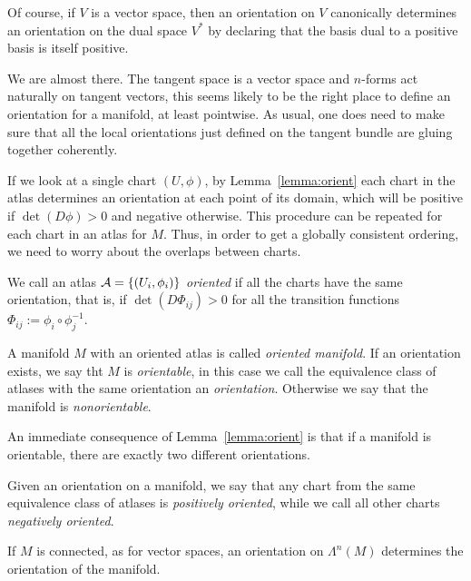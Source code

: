 \begin{remark}
  Of course, if $V$ is a vector space, then an orientation on $V$ canonically determines an orientation on the dual space $V^*$ by declaring that the basis dual to a positive basis is itself positive.
\end{remark}

We are almost there.
The tangent space is a vector space and $n$-forms act naturally on tangent vectors, this seems likely to be the right place to define an orientation for a manifold, at least pointwise.
As usual, one does need to make sure that all the local orientations just defined on the tangent bundle are gluing together coherently.

\begin{remark}
  If we look at a single chart $(U,\phi)$, by Lemma~\ref{lemma:orient} each chart in the atlas determines an orientation at each point of its domain, which will be positive if $\det(D\phi)>0$ and negative otherwise.
  This procedure can be repeated for each chart in an atlas for $M$.
  Thus, in order to get a globally consistent ordering, we need to worry about the overlaps between charts.
\end{remark}

\begin{definition}
  We call an atlas $\mathcal{A} = \{(U_i,\phi_i)\}$ \emph{oriented} if all the charts have the same orientation, that is, if $\det(D\Phi_{ij}) > 0$ for all the transition functions $\Phi_{ij} := \phi_i\circ\phi_j^{-1}$.

  A manifold $M$ with an oriented atlas is called \emph{oriented manifold}.
  If an orientation exists, we say tht $M$ is \emph{orientable}, in this case we call the equivalence class of atlases with the same orientation an \emph{orientation}.
  Otherwise we say that the manifold is \emph{nonorientable}.
\end{definition}

An immediate consequence of Lemma~\ref{lemma:orient} is that if a manifold is orientable, there are exactly two different orientations.

\begin{definition}
  Given an orientation on a manifold, we say that any chart from the same equivalence class of atlases is \emph{positively oriented}, while we call all other charts \emph{negatively oriented}.
\end{definition}

If $M$ is connected, as for vector spaces, an orientation on $\Lambda^n(M)$ determines the orientation of the manifold.


